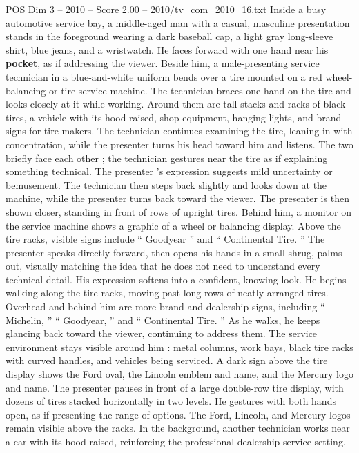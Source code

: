 \begin{textsample}{POS Dim 3 – 2010 – Score 2.00 – 2010/tv\_com\_2010\_16.txt}  \label{ex:f3_pos_090}
Inside a busy automotive service bay, a middle-aged man with a casual, masculine presentation stands in the foreground wearing a dark baseball cap, a light gray long-sleeve shirt, blue jeans, and a wristwatch.
He faces forward with one hand near his \textbf{pocket}, as if addressing the viewer.
Beside him, a male-presenting service technician in a blue-and-white uniform bends over a tire mounted on a red wheel-balancing or tire-service machine.
The technician braces one hand on the tire and looks closely at it while working.
Around them are tall stacks and racks of black tires, a vehicle with its hood raised, shop equipment, hanging lights, and brand signs for tire makers.
The technician continues examining the tire, leaning in with concentration, while the presenter turns his head toward him and listens.
The two briefly face each other ; the technician gestures near the tire as if explaining something technical.
The presenter ’s expression suggests mild uncertainty or bemusement.
The technician then steps back slightly and looks down at the machine, while the presenter turns back toward the viewer.
The presenter is then shown closer, standing in front of rows of upright tires.
Behind him, a monitor on the service machine shows a graphic of a wheel or balancing display.
Above the tire racks, visible signs include “ Goodyear ” and “ Continental Tire. ” The presenter speaks directly forward, then opens his hands in a small shrug, palms out, visually matching the idea that he does not need to understand every technical detail.
His expression softens into a confident, knowing look.
He begins walking along the tire racks, moving past long rows of neatly arranged tires.
Overhead and behind him are more brand and dealership signs, including “ Michelin, ” “ Goodyear, ” and “ Continental Tire. ” As he walks, he keeps glancing back toward the viewer, continuing to address them.
The service environment stays visible around him : metal columns, work bays, black tire racks with curved handles, and vehicles being serviced.
A dark sign above the tire display shows the Ford oval, the Lincoln emblem and name, and the Mercury logo and name.
The presenter pauses in front of a large double-row tire display, with dozens of tires stacked horizontally in two levels.
He gestures with both hands open, as if presenting the range of options.
The Ford, Lincoln, and Mercury logos remain visible above the racks.
In the background, another technician works near a car with its hood raised, reinforcing the professional dealership service setting.

\end{textsample}
